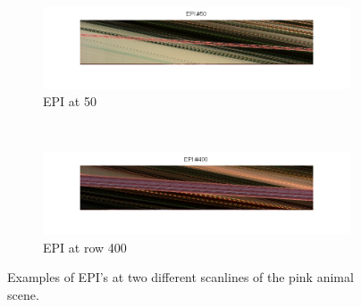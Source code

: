 \documentclass[a4paper]{article}
\begin{document}
\begin{figure}[ht]
	\vspace{2mm}
	\begin{subfigure}[h]{0.48\textwidth}
	  \includegraphics[width=\textwidth]{EPI50}
	  \caption*{EPI at 50}
	\end{subfigure}
    	~
	\begin{subfigure}[h]{0.48\textwidth}
	  \centering
	  \includegraphics[width=\textwidth]{EPI400}
	  \caption*{EPI at row 400}
	\end{subfigure}
\caption{Examples of EPI's at two different scanlines of the pink animal scene.}
\label{fig:EPIs}
\end{figure}
\end{document}
